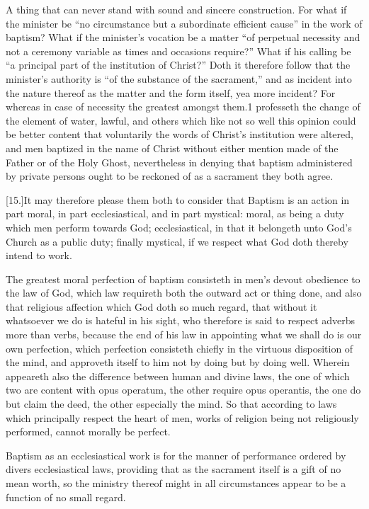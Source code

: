 A thing that can never stand with sound and sincere construction. For what if the minister be “no circumstance but a subordinate efficient cause” in the work of baptism? What if the minister’s vocation be a matter “of perpetual necessity and not a ceremony variable as times and occasions require?” What if his calling be “a principal part of the institution of Christ?” Doth it therefore follow that the minister’s authority is “of the substance of the sacrament,” and as incident into the nature thereof as  the matter and the form itself, yea more incident?
 For whereas in case of necessity the greatest amongst them.1 professeth the change of the element of water, lawful, and others which like not so well this opinion could be better content that voluntarily the words of Christ’s institution were altered, and men baptized in the name of Christ without either mention made of the Father or of the Holy Ghost, nevertheless in denying that baptism administered by private persons ought to be reckoned of as a sacrament they both agree.

[15.]It may therefore please them both to consider that Baptism is an action in part moral, in part ecclesiastical, and in part mystical: moral, as being a duty which men perform towards God; ecclesiastical, in that it belongeth unto God’s Church as a public duty; finally mystical, if we respect what God doth thereby intend to work.

The greatest moral perfection of baptism consisteth in men’s devout obedience to the law of God, which law requireth both the outward act or thing done, and also that religious affection which God doth so much regard, that without it whatsoever we do is hateful in his sight, who therefore is said to respect adverbs more than verbs, because the end of his  law in appointing what we shall do is our own perfection, which perfection consisteth chiefly in the virtuous disposition of the mind, and approveth itself to him not by doing but by doing well. Wherein appeareth also the difference between human and divine laws, the one of which two are content with opus operatum, the other require opus operantis, the one do but claim the deed, the other especially the mind. So that according to laws which principally respect the heart of men, works of religion being not religiously performed, cannot morally be perfect.

Baptism as an ecclesiastical work is for the manner of performance ordered by divers ecclesiastical laws, providing that as the sacrament itself is a gift of no mean worth, so the ministry thereof might in all circumstances appear to be a function of no small regard.

